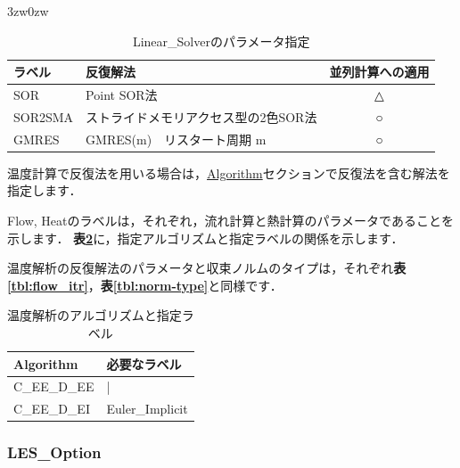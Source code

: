 \begin{indentation}{3zw}{0zw}
\begin{table}[htdp]
\caption{Linear\_Solverのパラメータ指定}
\begin{center}
\small
\begin{tabular}{llc} \toprule
ラベル & 反復解法 & 並列計算への適用\\ \midrule
SOR & Point SOR法 & △\\
SOR2SMA & ストライドメモリアクセス型の2色SOR法 & ○\\ 
GMRES & GMRES(m)　リスタート周期 m & ○\\ 
\bottomrule
\end{tabular}
\end{center}
\label{tbl:LS}
\end{table}


温度計算で反復法を用いる場合は，\hyperlink{tgt:algorithm}{Algorithm}セクションで反復法を含む解法を指定します．

Flow, Heatのラベルは，それぞれ，流れ計算と熱計算のパラメータであることを示します．
\textbf{表\ref{tbl:itr_temp_algo}}に，指定アルゴリズムと指定ラベルの関係を示します．

温度解析の反復解法のパラメータと収束ノルムのタイプは，それぞれ\textbf{表\ref{tbl:flow_itr}}，\textbf{表\ref{tbl:norm-type}}と同様です．

\begin{table}[htdp]
\caption{温度解析のアルゴリズムと指定ラベル}
\begin{center}
\small
\begin{tabular}{ll} \toprule
Algorithm &  必要なラベル\\ \midrule
C\_EE\_D\_EE & | \\
C\_EE\_D\_EI & Euler\_Implicit\\ \bottomrule
\end{tabular}
\end{center}
\label{tbl:itr_temp_algo}
\end{table}

\end{indentation}



\pagebreak
\subsubsection{LES\_Option}

